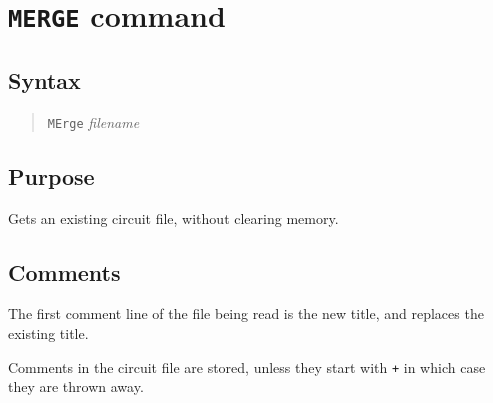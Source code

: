 %
%
%
%
\section{{\tt MERGE} command}
\subsection{Syntax}
\begin{verse}
{\tt MErge} {\it filename}
\end{verse}
\subsection{Purpose}

Gets an existing circuit file, without clearing memory.
\subsection{Comments}

The first comment line of the file being read is the new title, and replaces
the existing title.

Comments in the circuit file are stored, unless they start with {\tt *+} in
which case they are thrown away.

